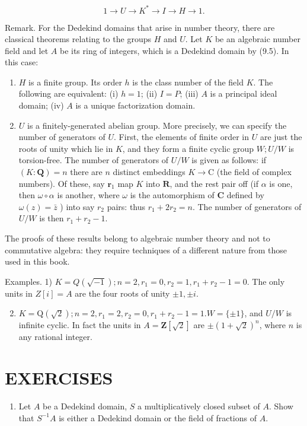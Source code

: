 \documentclass{standalone}
\theoremstyle{definition}
\theoremstyle{remark}
\begin{document}
\[
1 \rightarrow U \rightarrow K^{*} \rightarrow I \rightarrow H \rightarrow 1 .
\]

Remark. For the Dedekind domains that arise in number theory, there are classical theorems relating to the groups $H$ and $U$. Let $K$ be an algebraic number field and let $A$ be its ring of integers, which is a Dedekind domain by (9.5). In this case:

\begin{enumerate}
  \item $H$ is a finite group. Its order $h$ is the class number of the field $K$. The following are equivalent: (i) $h=1$; (ii) $I=P$; (iii) $A$ is a principal ideal domain; (iv) $A$ is a unique factorization domain.

  \item $U$ is a finitely-generated abelian group. More precisely, we can specify the number of generators of $U$. First, the elements of finite order in $U$ are just the roots of unity which lie in $K$, and they form a finite cyclic group $W ; U / W$ is torsion-free. The number of generators of $U / W$ is given as follows: if $(K: \mathbf{Q})=n$ there are $n$ distinct embeddings $K \rightarrow \mathrm{C}$ (the field of complex numbers). Of these, say $\boldsymbol{r}_{1}$ map $K$ into $\mathbf{R}$, and the rest pair off (if $\alpha$ is one, then $\omega \circ \alpha$ is another, where $\omega$ is the automorphism of $\mathbf{C}$ defined by $\omega(z)=\bar{z}$ ) into say $r_{2}$ pairs: thus $r_{1}+2 r_{2}=n$. The number of generators of $U / W$ is then $r_{1}+r_{2}-1$.

\end{enumerate}

The proofs of these results belong to algebraic number theory and not to commutative algebra: they require techniques of a different nature from those used in this book.

Examples. 1) $K=Q(\sqrt{-1}) ; n=2, r_{1}=0, r_{2}=1, r_{1}+r_{2}-1=0$. The only units in $Z[i]=A$ are the four roots of unity $\pm 1, \pm i$.

\begin{enumerate}
  \setcounter{enumi}{1}
  \item $K=\mathrm{Q}(\sqrt{2}) ; n=2, r_{1}=2, r_{2}=0, r_{1}+r_{2}-1=1 . W=\{ \pm 1\}$, and $U / W$ is infinite cyclic. In fact the units in $A=\mathbf{Z}[\sqrt{2}]$ are $\pm(1+\sqrt{2})^{n}$, where $n$ is any rational integer.
\end{enumerate}

\section{EXERCISES}
\begin{enumerate}
  \item Let $A$ be a Dedekind domain, $S$ a multiplicatively closed subset of $A$. Show that $S^{-1} A$ is either a Dedekind domain or the field of fractions of $A$.
\end{enumerate}
\end{document}
